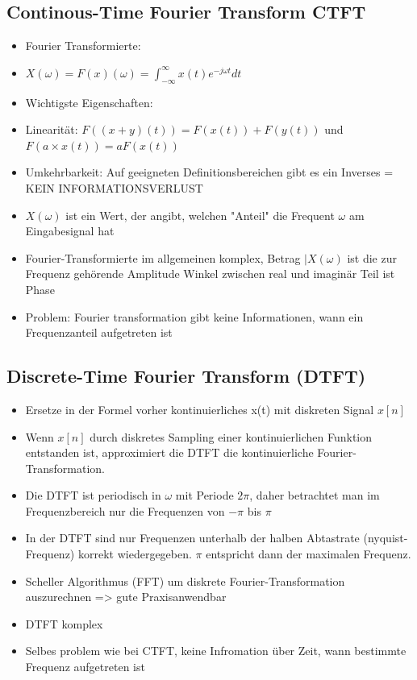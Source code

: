 \documentclass[a4paper,10pt,oneside]{article}
\begin{document}
\subsection{Continous-Time Fourier Transform CTFT}
\begin{itemize}
	\item Fourier Transformierte:
	\item $X(\omega) = F(x)(\omega)= \int_{-\infty}^\infty x(t)e^{-j\omega t}dt $
	\item Wichtigste Eigenschaften:
	\item Linearität: $F((x+y)(t)) = F(x(t)) + F(y(t))$ und $F(a\times x(t)) = aF(x(t))$
	\item Umkehrbarkeit: Auf geeigneten Definitionsbereichen gibt es ein Inverses = KEIN INFORMATIONSVERLUST
	\item $X(\omega)$ ist ein Wert, der angibt, welchen "Anteil" die Frequent $\omega$ am Eingabesignal hat
	\item Fourier-Transformierte im allgemeinen komplex, Betrag $|X(\omega)$ ist die zur Frequenz gehörende Amplitude Winkel zwischen real und imaginär Teil ist Phase
	\item Problem: Fourier transformation gibt keine Informationen, wann ein Frequenzanteil aufgetreten ist
\end{itemize}

\subsection{Discrete-Time Fourier Transform (DTFT)}
\begin{itemize}
	\item Ersetze in der Formel vorher kontinuierliches x(t) mit diskreten Signal $x[n]$
	\item Wenn $x[n]$ durch diskretes Sampling einer kontinuierlichen Funktion entstanden ist, approximiert die DTFT die kontinuierliche Fourier-Transformation.
	\item Die DTFT ist periodisch in $\omega$ mit Periode $2\pi$, daher betrachtet man im Frequenzbereich nur die Frequenzen von $-\pi$ bis $\pi$
	\item In der DTFT sind nur Frequenzen unterhalb der halben Abtastrate (nyquist-Frequenz) korrekt wiedergegeben. $\pi$ entspricht dann der maximalen Frequenz.
	\item Scheller Algorithmus (FFT) um diskrete Fourier-Transformation auszurechnen => gute Praxisanwendbar
	\item DTFT komplex
	\item Selbes problem wie bei CTFT, keine Infromation über Zeit, wann bestimmte Frequenz aufgetreten ist	
\end{itemize}
\end{document}
